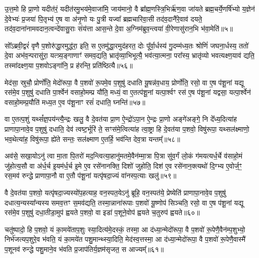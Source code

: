 उ॒त्त॒मो हि प्रा॒णो यदीत॑रं॒ यदीत॑रमु॒भय॑मे॒वाजा॑मि॒ जाय॑मानो॒ वै ब्रा᳚ह्म॒णस्त्रि॒भिर्\mbox{}ऋ॑ण॒वा जा॑यते ब्रह्म॒चर्ये॒णर्\mbox{}षि॑भ्यो य॒ज्ञेन॑ दे॒वेभ्यः॑ प्र॒जया॑ पि॒तृभ्य॑ ए॒ष वा अ॑नृ॒णो यः पु॒त्री यज्वा᳚ ब्रह्मचारिवा॒सी तद॑व॒दानै॑रे॒वाव॑ दयते॒ तद॑व॒दाना॑नामवदान॒त्वन्दे॑वासु॒राः संय॑त्ता आस॒न्ते दे॒वा अ॒ग्निम॑ब्रुव॒न्त्वया॑ वी॒रेणासु॑रान॒भि भ॑वा॒मेति॑॥५॥

सो᳚\-ऽब्रवी॒द्वरं॑ वृणै प॒शोरु॑द्धा॒रमुद्ध॑रा॒ इति॒ स ए॒तमु॑द्धा॒रमुद॑हरत॒ दोः पू᳚र्वा॒र्धस्य॑ गु॒दम्म॑ध्य॒तः श्रोणिं॑ जघना॒र्धस्य॒ ततो॑ दे॒वा अभ॑व॒न्परासु॑रा॒ यत्त्र्य॒ङ्गाणाꣳ॑ समव॒द्यति॒ भ्रातृ॑व्या॒भिभूत्यै॒ भव॑त्या॒त्मना॒ परा᳚स्य॒ भ्रातृ॑व्यो भवत्यक्ष्ण॒याव॑ द्यति॒ तस्मा॑दक्ष्ण॒या प॒शवो\-ऽङ्गा॑नि॒ प्र ह॑रन्ति॒ प्रति॑ष्ठित्यै॥५६॥

{\anuvakamend[{ए॒तौ प॑शू॒नाꣳ समे॑धस्यै॒व तस्यावो᳚त्त॒मस्याव॑ द्य॒तीति॒ पञ्च॑चत्वारिꣳशच्च}]}%

मेद॑सा॒ स्रुचौ॒ प्रोर्णो॑ति॒ मेदो॑रूपा॒ वै प॒शवो॑ रू॒पमे॒व प॒शुषु॑ दधाति यू॒षन्न॑व॒धाय॒ प्रोर्णो॑ति॒ रसो॒ वा ए॒ष प॑शू॒नां यद्यू रस॑मे॒व प॒शुषु॑ दधाति पा॒र्श्वेन॑ वसाहो॒मम्प्र यौ॑ति॒ मध्यं॒ वा ए॒तत्प॑शू॒नां यत्पा॒र्श्वꣳ रस॑ ए॒ष प॑शू॒नां यद्वसा॒ यत्पा॒र्श्वेन॑ वसाहो॒मम्प्र॒यौति॑ मध्य॒त ए॒व प॑शू॒नाꣳ रसं॑ दधाति॒ घ्नन्ति॑॥५७॥

वा ए॒तत्प॒शुं यथ्सं᳚ज्ञ॒पय॑न्त्यै॒न्द्रः खलु॒ वै दे॒वत॑या प्रा॒ण ऐ॒न्द्रो॑\-ऽपा॒न ऐ॒न्द्रः प्रा॒णो अङ्गे॑अङ्गे॒ नि दे᳚ध्य॒दित्या॑ह प्राणापा॒नावे॒व प॒शुषु॑ दधाति॒ देव॑ त्वष्ट॒र्भूरि॑ ते॒ सꣳस॑मे॒त्वित्या॑ह त्वा॒ष्ट्रा हि दे॒वत॑या प॒शवो॒ विषु॑रूपा॒ यथ्सल॑क्ष्माणो॒ भव॒थेत्या॑ह॒ विषु॑रूपा॒ ह्ये॑ते सन्तः॒ सल॑क्ष्माण ए॒तर्\mbox{}हि॒ भव॑न्ति देव॒त्रा यन्तम्᳚॥५८॥

अव॑से॒ सखा॒यो\-ऽनु॑ त्वा मा॒ता पि॒तरो॑ मद॒न्त्वित्या॒हानु॑मतमे॒वैन॑म्मा॒त्रा पि॒त्रा सु॑व॒र्गं लो॒कं ग॑मयत्यर्ध॒र्चे व॑साहो॒मं जु॑होत्य॒सौ वा अ॑र्ध॒र्च इ॒यम॑र्ध॒र्च इ॒मे ए॒व रसे॑नानक्ति॒ दिशो॑ जुहोति॒ दिश॑ ए॒व रसे॑नान॒क्त्यथो॑ दि॒ग्भ्य ए॒वोर्ज॒ꣳ॒ रस॒मव॑ रुन्द्धे प्राणापा॒नौ वा ए॒तौ प॑शू॒नां यत्पृ॑षदा॒ज्यं वा॑नस्प॒त्याः खलु॑॥५९॥

वै दे॒वत॑या प॒शवो॒ यत्पृ॑षदा॒ज्यस्यो॑प॒हत्याह॒ वन॒स्पत॒ये\-ऽनु॑ ब्रूहि॒ वन॒स्पत॑ये॒ प्रेष्येति॑ प्राणापा॒नावे॒व प॒शुषु॑ दधात्य॒न्यस्या᳚न्यस्य समव॒त्तꣳ स॒मव॑द्यति॒ तस्मा॒न्नाना॑रूपाः प॒शवो॑ यू॒ष्णोप॑ सिञ्चति॒ रसो॒ वा ए॒ष प॑शू॒नां यद्यू रस॑मे॒व प॒शुषु॑ दधा॒तीडा॒मुप॑ ह्वयते प॒शवो॒ वा इडा॑ प॒शूने॒वोप॑ ह्वयते च॒तुरुप॑ ह्वयते॥६०॥

चतु॑ष्पादो॒ हि प॒शवो॒ यं का॒मये॑ताप॒शुः स्या॒दित्य॑मे॒दस्कं॒ तस्मा॒ आ द॑ध्या॒न्मेदो॑रूपा॒ वै प॒शवो॑ रू॒पेणै॒वैन॑म्प॒शुभ्यो॒ निर्भ॑जत्यप॒शुरे॒व भ॑वति॒ यं का॒मये॑त पशु॒मान्थ्स्या॒दिति॒ मेद॑स्व॒त्तस्मा॒ आ द॑ध्या॒न्मेदो॑रूपा॒ वै प॒शवो॑ रू॒पेणै॒वास्मै॑ प॒शूनव॑ रुन्द्धे पशु॒माने॒व भ॑वति प्र॒जाप॑तिर्य॒ज्ञम॑सृजत॒ स आज्यम्᳚॥६१॥

